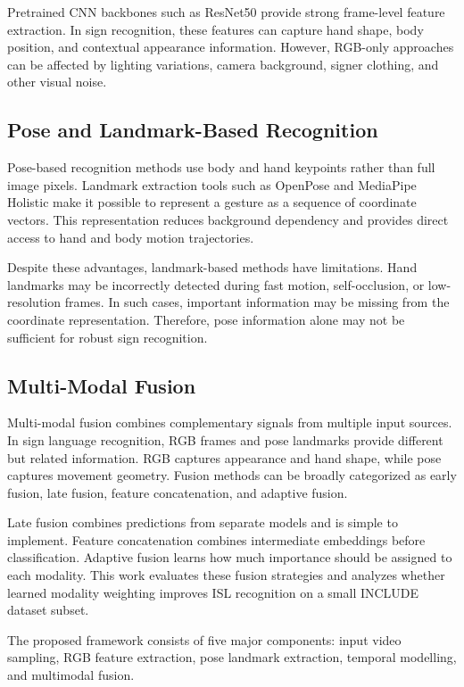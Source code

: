 \documentclass[conference]{IEEEtran}
\begin{document}
Pretrained CNN backbones such as ResNet50 provide strong frame-level feature extraction. In sign recognition, these features can capture hand shape, body position, and contextual appearance information. However, RGB-only approaches can be affected by lighting variations, camera background, signer clothing, and other visual noise.

\subsection{Pose and Landmark-Based Recognition}

Pose-based recognition methods use body and hand keypoints rather than full image pixels. Landmark extraction tools such as OpenPose and MediaPipe Holistic make it possible to represent a gesture as a sequence of coordinate vectors. This representation reduces background dependency and provides direct access to hand and body motion trajectories.

Despite these advantages, landmark-based methods have limitations. Hand landmarks may be incorrectly detected during fast motion, self-occlusion, or low-resolution frames. In such cases, important information may be missing from the coordinate representation. Therefore, pose information alone may not be sufficient for robust sign recognition.

\subsection{Multi-Modal Fusion}

Multi-modal fusion combines complementary signals from multiple input sources. In sign language recognition, RGB frames and pose landmarks provide different but related information. RGB captures appearance and hand shape, while pose captures movement geometry. Fusion methods can be broadly categorized as early fusion, late fusion, feature concatenation, and adaptive fusion.

Late fusion combines predictions from separate models and is simple to implement. Feature concatenation combines intermediate embeddings before classification. Adaptive fusion learns how much importance should be assigned to each modality. This work evaluates these fusion strategies and analyzes whether learned modality weighting improves ISL recognition on a small INCLUDE dataset subset.


The proposed framework consists of five major components: input video sampling, RGB feature extraction, pose landmark extraction, temporal modelling, and multimodal fusion.
\end{document}
